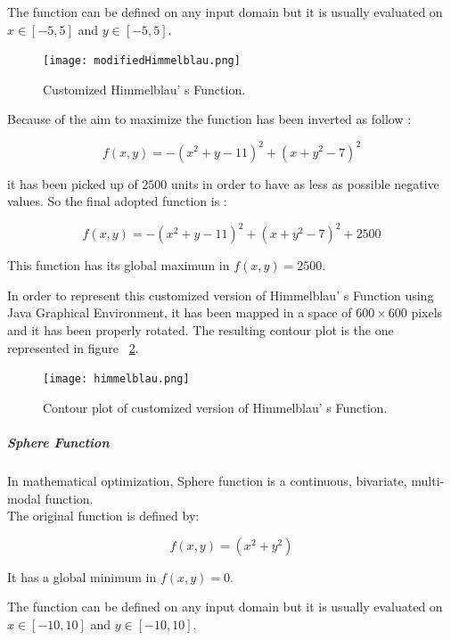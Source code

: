 The function can be defined on any input domain but it is usually evaluated on $x \in [-5, 5]$ and $y \in [-5, 5]$.

\begin{figure}[h!]
	\centering
	\texttt{[image: modifiedHimmelblau.png]}
	\caption{Customized Himmelblau' s Function.}
	\label{fig:CustomizedHimmelblauFunction}
\end{figure}

Because of the aim to maximize the function has been inverted as follow :

\begin{equation}
f(x, y) = -(x^2 + y -11)^2 + (x + y^2 - 7)^2
\end{equation}

it has been picked up of $2500$ units in order to have as less as possible negative values. So the final adopted function is :
 
\begin{equation}
f(x, y) = -(x^2 + y -11)^2 + (x + y^2 - 7)^2 + 2500
\end{equation}

This function has its global maximum in $f(x, y) = 2500$. 

In order to represent this customized version of Himmelblau' s Function using Java Graphical Environment, it has been mapped in a space of $600 \times 600$ pixels and it has been properly rotated. The resulting contour plot is the one represented in figure ~\ref{fig:ContourPlotCustomizedHimmelblauFunction}. \\

\begin{figure}[h!]
	\centering
	\texttt{[image: himmelblau.png]}
	\caption{Contour plot of customized version of Himmelblau' s Function.}
	\label{fig:ContourPlotCustomizedHimmelblauFunction}
\end{figure}
 
\subparagraph{Sphere Function} In mathematical optimization, Sphere function is a continuous, bivariate, multi-modal function. \\

The original function is defined by: 

\begin{equation}
f(x, y) = (x^2 + y^2) 
\end{equation}

It has a global minimum in $f(x, y) = 0$.

The function can be defined on any input domain but it is usually evaluated on $x \in [-10, 10]$ and $y \in [-10, 10]$. 

